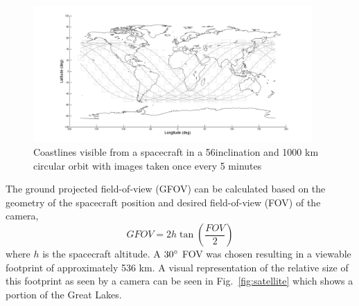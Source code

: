 \documentclass[]{aiaa-tc}%
\begin{document}
\begin{figure}[ht!]
\centering
\includegraphics[width=0.95\textwidth]{ISScoverage} %
\caption{Coastlines visible from a spacecraft in a 56\degree inclination and 1000 km circular orbit with images taken once every 5 minutes}
\label{fig:coverage}
\end{figure}
%
The ground projected field-of-view (GFOV) can be calculated based on the geometry of the spacecraft position and desired field-of-view (FOV) of the camera,
%
\begin{equation}
GFOV=2h\tan\left(\frac{FOV}{2}\right)
\label{eq:GFOV}
\end{equation}
%
where $h$ is the spacecraft altitude.  A $30\degree$ FOV was chosen resulting in a viewable footprint of approximately 536 km.  A visual representation of the relative size of this footprint as seen by a camera can be seen in Fig.~\ref{fig:satellite} which shows a portion of the Great Lakes.
%
\end{document}
